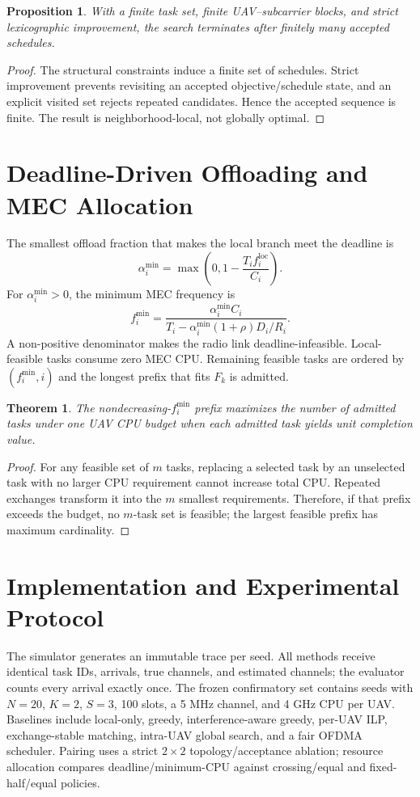 \documentclass[journal]{IEEEtran}
\newtheorem{proposition}{Proposition}
\newtheorem{theorem}{Theorem}
\begin{document}
\begin{proposition}
With a finite task set, finite UAV--subcarrier blocks, and strict lexicographic improvement, the
search terminates after finitely many accepted schedules.
\end{proposition}
\begin{proof}
The structural constraints induce a finite set of schedules. Strict improvement prevents revisiting
an accepted objective/schedule state, and an explicit visited set rejects repeated candidates.
Hence the accepted sequence is finite. The result is neighborhood-local, not globally optimal.
\end{proof}

\section{Deadline-Driven Offloading and MEC Allocation}
The smallest offload fraction that makes the local branch meet the deadline is
\begin{equation}
 \alpha_i^{\min}=\max\!\left(0,1-\frac{T_i f_i^{\mathrm{loc}}}{C_i}\right).
\end{equation}
For $\alpha_i^{\min}>0$, the minimum MEC frequency is
\begin{equation}
 f_i^{\min}=\frac{\alpha_i^{\min}C_i}
 {T_i-\alpha_i^{\min}(1+\rho)D_i/R_i}.
\end{equation}
A non-positive denominator makes the radio link deadline-infeasible. Local-feasible tasks consume
zero MEC CPU. Remaining feasible tasks are ordered by $(f_i^{\min},i)$ and the longest prefix that
fits $F_k$ is admitted.

\begin{theorem}
The nondecreasing-$f_i^{\min}$ prefix maximizes the number of admitted tasks under one UAV CPU
budget when each admitted task yields unit completion value.
\end{theorem}
\begin{proof}
For any feasible set of $m$ tasks, replacing a selected task by an unselected task with no larger
CPU requirement cannot increase total CPU. Repeated exchanges transform it into the $m$ smallest
requirements. Therefore, if that prefix exceeds the budget, no $m$-task set is feasible; the
largest feasible prefix has maximum cardinality.
\end{proof}

\section{Implementation and Experimental Protocol}
The simulator generates an immutable trace per seed. All methods receive identical task IDs,
arrivals, true channels, and estimated channels; the evaluator counts every arrival exactly once.
The frozen confirmatory set contains \ConfirmatorySeedCount{} seeds with $N=20$, $K=2$, $S=3$,
100 slots, a 5 MHz channel, and 4 GHz CPU per UAV. Baselines include local-only, greedy,
interference-aware greedy, per-UAV ILP, exchange-stable matching, intra-UAV global search, and a
fair OFDMA scheduler. Pairing uses a strict $2\times2$ topology/acceptance ablation; resource
allocation compares deadline/minimum-CPU against crossing/equal and fixed-half/equal policies.
\end{document}

